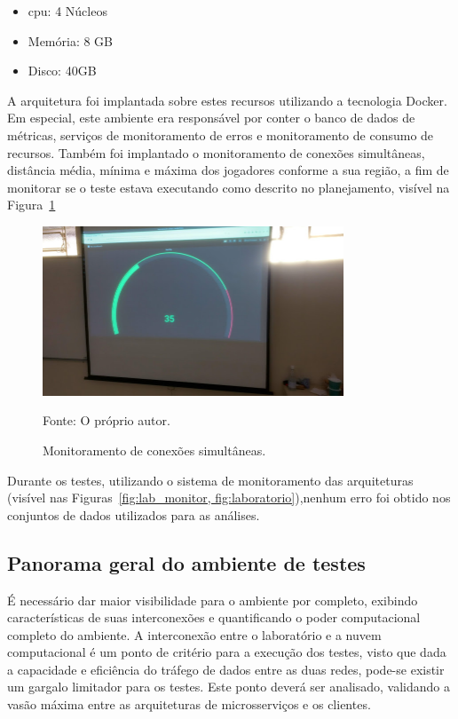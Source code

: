 \begin{itemize}
  \item \ac{cpu}: 4 Núcleos
  \item Memória: 8 GB
  \item Disco: 40GB
\end{itemize}

A arquitetura foi implantada sobre estes recursos utilizando a tecnologia Docker. Em especial, este ambiente era responsável por conter o banco de dados de métricas, serviços de monitoramento de erros e monitoramento de consumo de recursos.
%
Também foi implantado o monitoramento de conexões simultâneas, distância média, mínima e máxima dos jogadores conforme a sua região, a fim de monitorar se o teste estava executando como descrito no planejamento, visível na Figura~\ref{fig:lab_monitor}

\begin{figure}[htb!]
  \caption{Monitoramento de conexões simultâneas.}
  \label{fig:lab_monitor}
  \includegraphics[width=0.8\textwidth]{figuras/network/metrics.jpg}
  \centering

  Fonte: O próprio autor.
\end{figure}

Durante os testes, utilizando o sistema de monitoramento das arquiteturas (visível nas Figuras~\ref{fig:lab_monitor, fig:laboratorio}),nenhum erro foi obtido nos conjuntos de dados utilizados para as análises.

\subsection{Panorama geral do ambiente de testes}
\label{sec:nuvem_lab}

É necessário dar maior visibilidade para o ambiente por completo, exibindo características de suas interconexões e quantificando o poder computacional completo do ambiente.
%
A interconexão entre o laboratório e a nuvem computacional é um ponto de critério para a execução dos testes, visto que dada a capacidade e eficiência do tráfego de dados entre as duas redes, pode-se existir um gargalo limitador para os testes.
%
Este ponto deverá ser analisado, validando a vasão máxima entre as arquiteturas de microsserviços e os clientes.
